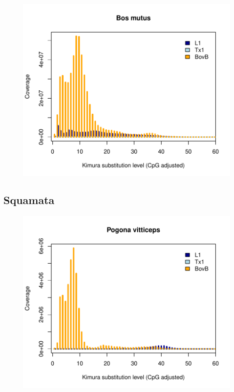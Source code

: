 \documentclass[12pt,a4paper,times]{article}
\begin{document}
\begin{figure}[H]
	\centering
	\includegraphics[scale=0.8]{suppFigures/divergencePlots/Bos_mutus.pdf}
	\caption{\label{BosM}}
\end{figure}

\subsection*{Squamata}

\begin{figure}[H]
	\centering
	\includegraphics[scale=0.8]{suppFigures/divergencePlots/Pogona_vitticeps.pdf}
	\caption{\label{fig:Pogona_vitticeps}}
\end{figure}
\end{document}
